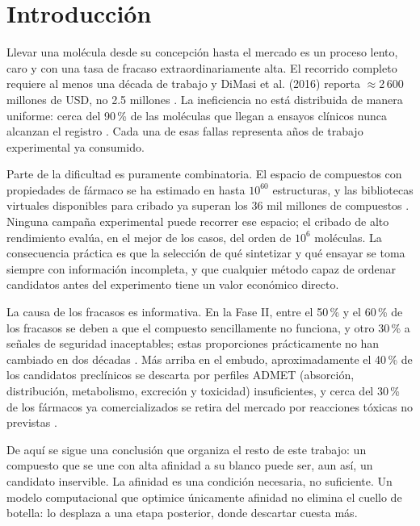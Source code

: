 

\section{Introducción}
\label{cap:introduccion}


Llevar una molécula desde su concepción hasta el mercado es un proceso lento,
caro y con una tasa de fracaso extraordinariamente alta. El recorrido completo
requiere al menos una década de trabajo y  DiMasi et al. (2016) reporta $\approx$2\,600 millones de USD, no 2.5
millones  \cite{mao_artificial_2026}. La ineficiencia no está distribuida de manera
uniforme: cerca del 90\,\% de las moléculas que llegan a ensayos clínicos nunca
alcanzan el registro \cite{zhang_ssgnn_2023,  czub_automlbased_2022}. Cada una de esas fallas
representa años de trabajo experimental ya consumido.
 
Parte de la dificultad es puramente combinatoria. El espacio de compuestos con
propiedades de fármaco se ha estimado en hasta $10^{60}$ estructuras, y las
bibliotecas virtuales disponibles para cribado ya superan los 36 mil millones de
compuestos \cite{hasselgren_artificial_2024}. Ninguna campaña experimental puede recorrer
ese espacio; el cribado de alto rendimiento evalúa, en el mejor de los casos,
del orden de $10^6$ moléculas. La consecuencia práctica es que la selección de
qué sintetizar y qué ensayar se toma siempre con información incompleta, y que
cualquier método capaz de ordenar candidatos antes del experimento tiene un
valor económico directo.

 
La causa de los fracasos es informativa. En la Fase II, entre el 50\,\% y el
60\,\% de los fracasos se deben a que el compuesto sencillamente no funciona,
y otro 30\,\% a señales de seguridad inaceptables; estas proporciones
prácticamente no han cambiado en dos décadas \cite{mao_artificial_2026}. Más arriba en
el embudo, aproximadamente el 40\,\% de los candidatos preclínicos se descarta
por perfiles ADMET (absorción, distribución, metabolismo, excreción y
toxicidad) insuficientes, y cerca del 30\,\% de los fármacos ya comercializados
se retira del mercado por reacciones tóxicas no previstas
\cite{zhang_computational_2025}.
 
De aquí se sigue una conclusión que organiza el resto de este trabajo: un
compuesto que se une con alta afinidad a su blanco puede ser, aun así, un
candidato inservible. La afinidad es una condición necesaria, no suficiente. Un
modelo computacional que optimice únicamente afinidad no elimina el cuello de
botella: lo desplaza a una etapa posterior, donde descartar cuesta más.
 


